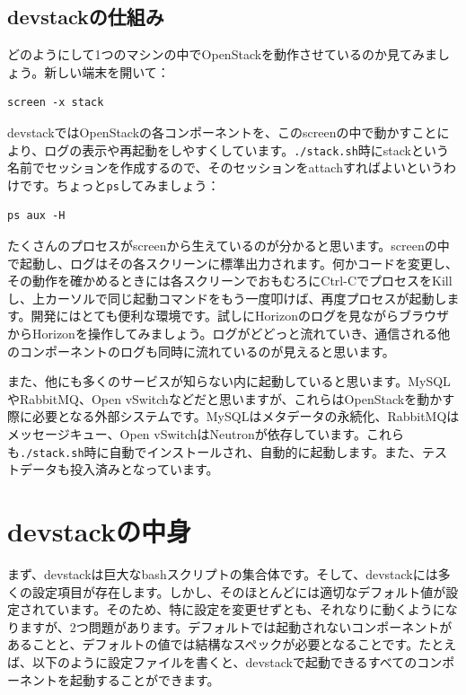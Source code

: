 \documentclass[9pt,b5paper,tombo,openany,dvipdfmx]{jsbook}
\begin{document}
\subsection{devstackの仕組み}

どのようにして1つのマシンの中でOpenStackを動作させているのか見てみましょう。新しい端末を開いて：

\begin{lstlisting}
screen -x stack
\end{lstlisting}

devstackではOpenStackの各コンポーネントを、このscreenの中で動かすことにより、ログの表示や再起動をしやすくしています。\verb|./stack.sh|時にstackという名前でセッションを作成するので、そのセッションをattachすればよいというわけです。ちょっと\verb|ps|してみましょう：

\begin{lstlisting}
ps aux -H
\end{lstlisting}

たくさんのプロセスがscreenから生えているのが分かると思います。screenの中で起動し、ログはその各スクリーンに標準出力されます。何かコードを変更し、その動作を確かめるときには各スクリーンでおもむろにCtrl-CでプロセスをKillし、上カーソルで同じ起動コマンドをもう一度叩けば、再度プロセスが起動します。開発にはとても便利な環境です。試しにHorizonのログを見ながらブラウザからHorizonを操作してみましょう。ログがどどっと流れていき、通信される他のコンポーネントのログも同時に流れているのが見えると思います。

また、他にも多くのサービスが知らない内に起動していると思います。MySQLやRabbitMQ、Open vSwitchなどだと思いますが、これらはOpenStackを動かす際に必要となる外部システムです。MySQLはメタデータの永続化、RabbitMQはメッセージキュー、Open vSwitchはNeutronが依存しています。これらも\verb|./stack.sh|時に自動でインストールされ、自動的に起動します。また、テストデータも投入済みとなっています。

\section{devstackの中身}

まず、devstackは巨大なbashスクリプトの集合体です。そして、devstackには多くの設定項目が存在します。しかし、そのほとんどには適切なデフォルト値が設定されています。そのため、特に設定を変更せずとも、それなりに動くようになりますが、2つ問題があります。デフォルトでは起動されないコンポーネントがあることと、デフォルトの値では結構なスペックが必要となることです。たとえば、以下のように設定ファイルを書くと、devstackで起動できるすべてのコンポーネントを起動することができます。
\end{document}

